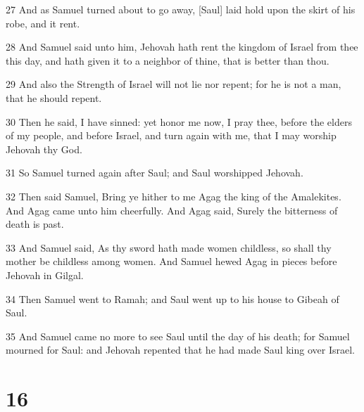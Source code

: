 \par 27 And as Samuel turned about to go away, [Saul] laid hold upon the skirt of his robe, and it rent.
\par 28 And Samuel said unto him, Jehovah hath rent the kingdom of Israel from thee this day, and hath given it to a neighbor of thine, that is better than thou.
\par 29 And also the Strength of Israel will not lie nor repent; for he is not a man, that he should repent.
\par 30 Then he said, I have sinned: yet honor me now, I pray thee, before the elders of my people, and before Israel, and turn again with me, that I may worship Jehovah thy God.
\par 31 So Samuel turned again after Saul; and Saul worshipped Jehovah.
\par 32 Then said Samuel, Bring ye hither to me Agag the king of the Amalekites. And Agag came unto him cheerfully. And Agag said, Surely the bitterness of death is past.
\par 33 And Samuel said, As thy sword hath made women childless, so shall thy mother be childless among women. And Samuel hewed Agag in pieces before Jehovah in Gilgal.
\par 34 Then Samuel went to Ramah; and Saul went up to his house to Gibeah of Saul.
\par 35 And Samuel came no more to see Saul until the day of his death; for Samuel mourned for Saul: and Jehovah repented that he had made Saul king over Israel.

\chapter{16}

